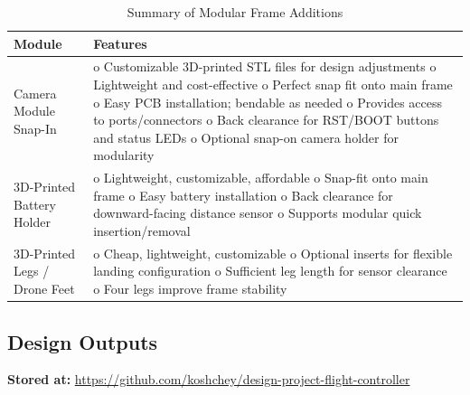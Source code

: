 \begin{table}[H]
\centering
\begin{tabular}{|p{3cm}|p{11cm}|}
\hline
\textbf{Module} & \textbf{Features} \\
\hline
Camera Module Snap-In &
o Customizable 3D-printed STL files for design adjustments \newline
o Lightweight and cost-effective \newline
o Perfect snap fit onto main frame \newline
o Easy PCB installation; bendable as needed \newline
o Provides access to ports/connectors \newline
o Back clearance for RST/BOOT buttons and status LEDs \newline
o Optional snap-on camera holder for modularity \\
\hline
3D-Printed Battery Holder & 
o Lightweight, customizable, affordable \newline
o Snap-fit onto main frame \newline
o Easy battery installation \newline
o Back clearance for downward-facing distance sensor \newline
o Supports modular quick insertion/removal \\
\hline
3D-Printed Legs / Drone Feet & 
o Cheap, lightweight, customizable \newline
o Optional inserts for flexible landing configuration \newline
o Sufficient leg length for sensor clearance \newline
o Four legs improve frame stability \\
\hline
\end{tabular}
\caption{Summary of Modular Frame Additions}
\label{tab:frame-add-summary}
\end{table}

\pagebreak
\subsection{Design Outputs}

\textbf{Stored at:} \url{https://github.com/koshchey/design-project-flight-controller}


